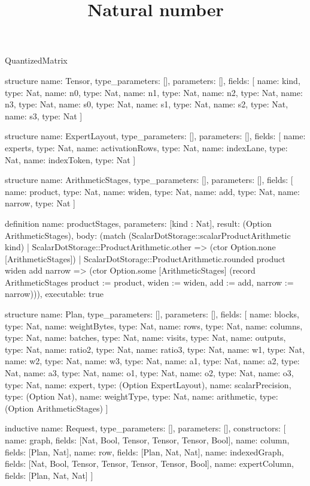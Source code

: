 \begin{lexlean}{QuantizedMatrix}
\title{Natural number}
\begin{semanticmodule}
structure{
  name: Tensor,
  type_parameters: [],
  parameters: [],
  fields: [
    {name: kind, type: Nat},
    {name: n0, type: Nat},
    {name: n1, type: Nat},
    {name: n2, type: Nat},
    {name: n3, type: Nat},
    {name: s0, type: Nat},
    {name: s1, type: Nat},
    {name: s2, type: Nat},
    {name: s3, type: Nat}
  ]
}

structure{
  name: ExpertLayout,
  type_parameters: [],
  parameters: [],
  fields: [
    {name: experts, type: Nat},
    {name: activationRows, type: Nat},
    {name: indexLane, type: Nat},
    {name: indexToken, type: Nat}
  ]
}

structure{
  name: ArithmeticStages,
  type_parameters: [],
  parameters: [],
  fields: [
    {name: product, type: Nat},
    {name: widen, type: Nat},
    {name: add, type: Nat},
    {name: narrow, type: Nat}
  ]
}

definition{
  name: productStages,
  parameters: [kind : Nat],
  result: (Option ArithmeticStages),
  body: (match (ScalarDotStorage::scalarProductArithmetic kind)
    | ScalarDotStorage::ProductArithmetic.other => (ctor Option.none [ArithmeticStages])
    | ScalarDotStorage::ProductArithmetic.rounded product widen add narrow =>
      (ctor Option.some [ArithmeticStages] (record ArithmeticStages {product := product, widen := widen, add := add, narrow := narrow}))),
  executable: true
}

structure{
  name: Plan,
  type_parameters: [],
  parameters: [],
  fields: [
    {name: blocks, type: Nat},
    {name: weightBytes, type: Nat},
    {name: rows, type: Nat},
    {name: columns, type: Nat},
    {name: batches, type: Nat},
    {name: visits, type: Nat},
    {name: outputs, type: Nat},
    {name: ratio2, type: Nat},
    {name: ratio3, type: Nat},
    {name: w1, type: Nat},
    {name: w2, type: Nat},
    {name: w3, type: Nat},
    {name: a1, type: Nat},
    {name: a2, type: Nat},
    {name: a3, type: Nat},
    {name: o1, type: Nat},
    {name: o2, type: Nat},
    {name: o3, type: Nat},
    {name: expert, type: (Option ExpertLayout)},
    {name: scalarPrecision, type: (Option Nat)},
    {name: weightType, type: Nat},
    {name: arithmetic, type: (Option ArithmeticStages)}
  ]
}

inductive{
  name: Request,
  type_parameters: [],
  parameters: [],
  constructors: [
    {name: graph, fields: [Nat, Bool, Tensor, Tensor, Tensor, Bool]},
    {name: column, fields: [Plan, Nat]},
    {name: row, fields: [Plan, Nat, Nat]},
    {name: indexedGraph, fields: [Nat, Bool, Tensor, Tensor, Tensor, Tensor, Bool]},
    {name: expertColumn, fields: [Plan, Nat, Nat]}
  ]
}


\end{semanticmodule}
\end{lexlean}
